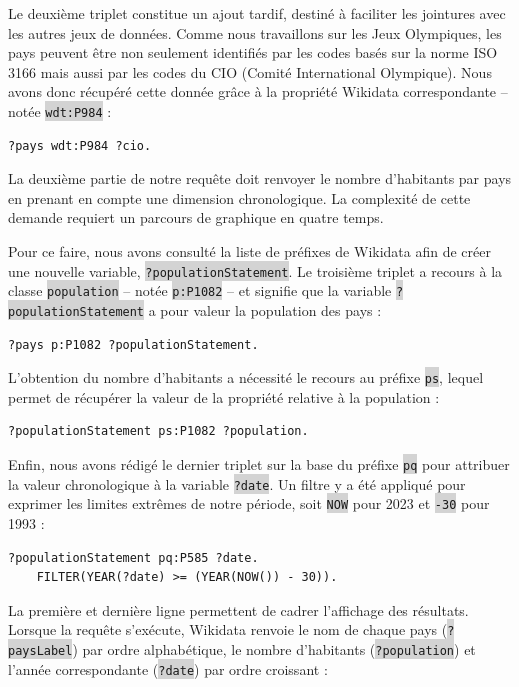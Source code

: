 \documentclass[hidelinks, 12pt]{report}
\newcommand{\code}[1]{\colorbox{LightGray}{\texttt{#1}}}
\begin{document}
Le deuxième triplet constitue un ajout tardif, destiné à faciliter les jointures avec les autres jeux de données. Comme nous travaillons sur les Jeux Olympiques, les pays peuvent être non seulement identifiés par les codes basés sur la norme ISO 3166 mais aussi par les codes du CIO (Comité International Olympique). Nous avons donc récupéré cette donnée grâce à la propriété Wikidata correspondante -- notée \code{wdt:P984} :

\begin{lstlisting}[language=SPARQL]
	?pays wdt:P984 ?cio.
\end{lstlisting}

La deuxième partie de notre requête doit renvoyer le nombre d'habitants par pays en prenant en compte une dimension chronologique. La complexité de cette demande requiert un parcours de graphique en quatre temps.

Pour ce faire, nous avons consulté la liste de préfixes\autocite{wikiprefixes} de Wikidata afin de créer une nouvelle variable, \code{?populationStatement}. Le troisième triplet a recours à la classe \code{population} -- notée \code{p:P1082} -- et signifie que la variable \code{?populationStatement} a pour valeur la population des pays :

\begin{lstlisting}[language=SPARQL]
	?pays p:P1082 ?populationStatement.
\end{lstlisting}

L'obtention du nombre d'habitants a nécessité le recours au préfixe \code{ps}, lequel permet de récupérer la valeur de la propriété relative à la population :

\begin{lstlisting}[language=SPARQL]
	?populationStatement ps:P1082 ?population.
\end{lstlisting}

Enfin, nous avons rédigé le dernier triplet sur la base du préfixe \code{pq} pour attribuer la valeur chronologique à la variable \code{?date}. Un filtre y a été appliqué pour exprimer les limites extrêmes de notre période, soit \code{NOW} pour 2023 et \code{-30} pour 1993 :

\begin{lstlisting}[language=SPARQL]
	?populationStatement pq:P585 ?date.
	FILTER(YEAR(?date) >= (YEAR(NOW()) - 30)).
\end{lstlisting}

La première et dernière ligne permettent de cadrer l'affichage des résultats. Lorsque la requête s'exécute, Wikidata renvoie le nom de chaque pays (\code{?paysLabel}) par ordre alphabétique, le nombre d'habitants (\code{?population}) et l'année correspondante (\code{?date}) par ordre croissant :
\end{document}
